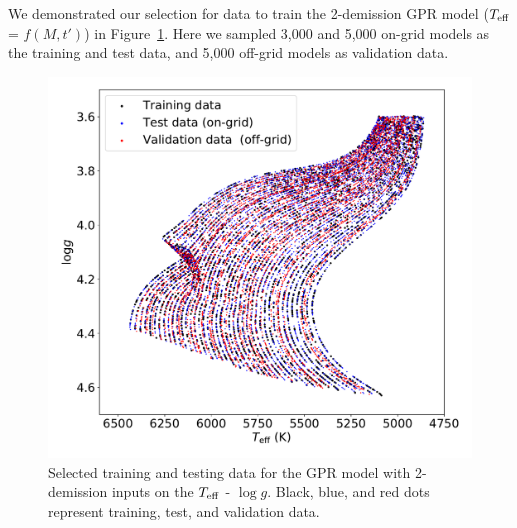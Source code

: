 %
%
We demonstrated our selection for data to train the 2-demission GPR model ($T_{\rm eff}$ = $f(M, t')$) in Figure~\ref{fig:data_on_hrd}.  Here we sampled 3,000 and 5,000 on-grid models as the training and test data, and 5,000 off-grid models as validation data.  

\begin{figure}
	\includegraphics[width=1.0\columnwidth]{2D_data_on_HR.pdf}
    \caption{Selected training and testing data for the GPR model with 2-demission inputs on the $T_{\rm eff}$ - $\log g$. Black, blue, and red dots represent training, test, and validation data. }
    \label{fig:data_on_hrd}
\end{figure}

